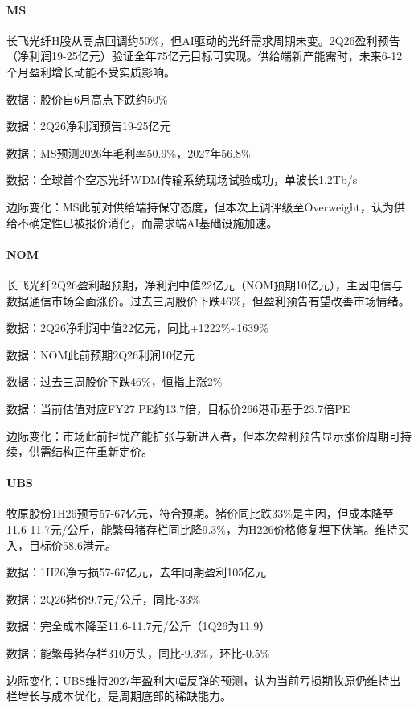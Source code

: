 \documentclass[11pt]{ctexart}
\begin{document}
\paragraph{MS} 长飞光纤H股从高点回调约50\%，但AI驱动的光纤需求周期未变。2Q26盈利预告（净利润19-25亿元）验证全年75亿元目标可实现。供给端新产能需时，未来6-12个月盈利增长动能不受实质影响。
{\small\color{refgray}数据：股价自6月高点下跌约50\%\par}
{\small\color{refgray}数据：2Q26净利润预告19-25亿元\par}
{\small\color{refgray}数据：MS预测2026年毛利率50.9\%，2027年56.8\%\par}
{\small\color{refgray}数据：全球首个空芯光纤WDM传输系统现场试验成功，单波长1.2Tb/s\par}
{\small\color{refgray}边际变化：MS此前对供给端持保守态度，但本次上调评级至Overweight，认为供给不确定性已被报价消化，而需求端AI基础设施加速。\par}
\paragraph{NOM} 长飞光纤2Q26盈利超预期，净利润中值22亿元（NOM预期10亿元），主因电信与数据通信市场全面涨价。过去三周股价下跌46\%，但盈利预告有望改善市场情绪。
{\small\color{refgray}数据：2Q26净利润中值22亿元，同比+1222\%\textasciitilde{}1639\%\par}
{\small\color{refgray}数据：NOM此前预期2Q26利润10亿元\par}
{\small\color{refgray}数据：过去三周股价下跌46\%，恒指上涨2\%\par}
{\small\color{refgray}数据：当前估值对应FY27 PE约13.7倍，目标价266港币基于23.7倍PE\par}
{\small\color{refgray}边际变化：市场此前担忧产能扩张与新进入者，但本次盈利预告显示涨价周期可持续，供需结构正在重新定价。\par}
\paragraph{UBS} 牧原股份1H26预亏57-67亿元，符合预期。猪价同比跌33\%是主因，但成本降至11.6-11.7元/公斤，能繁母猪存栏同比降9.3\%，为H226价格修复埋下伏笔。维持买入，目标价58.6港元。
{\small\color{refgray}数据：1H26净亏损57-67亿元，去年同期盈利105亿元\par}
{\small\color{refgray}数据：2Q26猪价9.7元/公斤，同比-33\%\par}
{\small\color{refgray}数据：完全成本降至11.6-11.7元/公斤（1Q26为11.9）\par}
{\small\color{refgray}数据：能繁母猪存栏310万头，同比-9.3\%，环比-0.5\%\par}
{\small\color{refgray}边际变化：UBS维持2027年盈利大幅反弹的预测，认为当前亏损期牧原仍维持出栏增长与成本优化，是周期底部的稀缺能力。\par}
\end{document}
